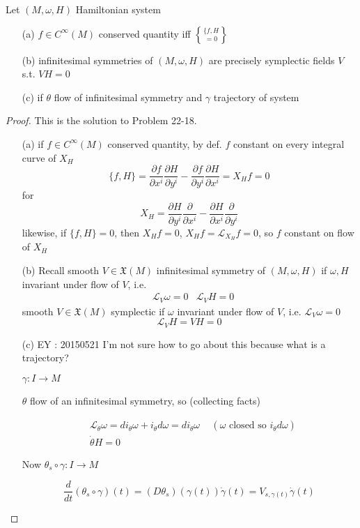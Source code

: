 \begin{proposition}[22.21]
Let $(M,\omega,H)$ Hamiltonian system
\begin{enumerate}
\item[(a)] $f \in C^{\infty}(M)$ conserved quantity iff $\lbrace f,H\brace =0$
\item[(b)] infinitesimal symmetries of $(M, \omega,H)$ are precisely symplectic fields $V$ s.t. $VH=0$ 
\item[(c)] if $\theta$ flow of infinitesimal symmetry and $\gamma$ trajectory of system
\end{enumerate}
\end{proposition}

\begin{proof}
This is the solution to Problem 22-18.  

\begin{enumerate}
\item[(a)] if $f\in C^{\infty}(M)$ conserved quantity, by def. $f$ constant on every integral curve of $X_H$
\[
\lbrace f,H\rbrace = \frac{ \partial f}{ \partial x^i} \frac{ \partial H}{ \partial y^i} - \frac{ \partial f}{ \partial y^i} \frac{ \partial H}{ \partial x^i} = X_H f = 0 
\]
for 
\[
X_H = \frac{ \partial H}{ \partial y^i} \frac{ \partial }{ \partial x^i} - \frac{ \partial H}{ \partial x^i} \frac{ \partial }{ \partial y^i} 
\] 
likewise, if $\lbrace f,H \rbrace =0$, then $X_Hf =0$, $X_Hf = \mathcal{L}_{X_H} f= 0 $, so $f$ constant on flow of $X_H$
\item[(b)] Recall smooth $V \in \mathfrak{X}(M)$ infinitesimal symmetry of $(M,\omega,H)$ if $\omega, H$ invariant under flow of $V$, i.e. 
\[
\begin{aligned}
  & \mathcal{L}_V \omega =0 
  &  \mathcal{L}_VH = 0 
\end{aligned}
\]
smooth $V\in \mathfrak{X}(M)$ symplectic if $\omega$ invariant under flow of $V$, i.e. $\mathcal{L}_V\omega =0$
\[
\mathcal{L}_VH = VH = 0
\]
\item[(c)] EY : 20150521 I'm not sure how to go about this because what is a trajectory?

$\gamma: I \to M$

$\theta$ flow of an infinitesimal symmetry, so (collecting facts)

\[
\begin{aligned}
  & \mathcal{L}_{\dot{\theta}}\omega = di_{\dot{\theta}}\omega + i_{\dot{\theta}}d\omega = di_{\dot{\theta}}\omega \quad \, (\omega \text{ closed so } i_{\dot{\theta}}d\omega) \\ 
  & \dot{\theta}H = 0 
\end{aligned}
\]

Now $\theta_s \circ \gamma : I \to M$

\[
\frac{d}{dt}(\theta_s \circ \gamma)(t) = (D\theta_s)(\gamma(t)) \dot{\gamma}(t) = V_{s,\gamma(t)} \dot{\gamma}(t)
\]
\end{enumerate}
\end{proof}

